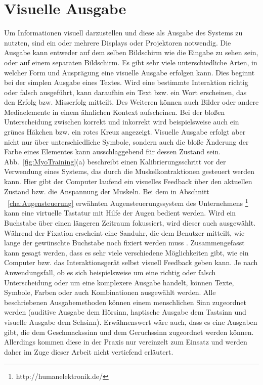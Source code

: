 \section{Visuelle Ausgabe}
Um Informationen visuell darzustellen und diese als Ausgabe des Systems zu nutzten, sind ein oder mehrere Displays oder Projektoren notwendig. Die Ausgabe kann entweder auf dem selben Bildschirm wie die Eingabe zu sehen sein, oder auf einem separaten Bildschirm.
\newline \newline
Es gibt sehr viele unterschiedliche Arten, in welcher Form und Ausprägung eine visuelle Ausgabe erfolgen kann. Dies beginnt bei der simplen Ausgabe eines Textes. Wird eine bestimmte Interaktion richtig oder falsch ausgeführt, kann daraufhin ein Text bzw. ein Wort erscheinen, das den Erfolg bzw. Misserfolg mitteilt. Des Weiteren können auch Bilder oder andere Mediaelemente in einem ähnlichen Kontext aufscheinen. Bei der bloßen Unterscheidung zwischen korrekt und inkorrekt wird beispielsweise auch ein grünes Häkchen bzw. ein rotes Kreuz angezeigt. Visuelle Ausgabe erfolgt aber nicht nur über unterschiedliche Symbole, sondern auch die bloße Änderung der Farbe eines Elementes kann ausschlaggebend für dessen Zustand sein.
\newline \newline
Abb.~\ref{fig:MyoTraining}(a) beschreibt einen Kalibrierungsschritt vor der Verwendung eines Systems, das durch die Muskelkontraktionen gesteuert werden kann. Hier gibt der Computer laufend ein visuelles Feedback über den aktuellen Zustand bzw. die Anspannung der Muskeln.
\newline \newline
Bei dem in Abschnitt ~\ref{cha:Augensteuerung} erwähnten Augensteuerungssystem des Unternehmens%
\footnote{http://humanelektronik.de/}
%
kann eine virtuelle Tastatur mit Hilfe der Augen bedient werden. Wird ein Buchstabe über einen längeren Zeitraum fokussiert, wird dieser auch ausgewählt. Während der Fixation erscheint eine Sanduhr, die dem Benutzer mitteilt, wie lange der gewünschte Buchstabe noch fixiert werden muss \cite{SEETECH}. 
%
\newline \newline
Zusammengefasst kann gesagt werden, dass es sehr viele verschiedene Möglichkeiten gibt, wie ein Computer bzw. das Interaktionsgerät selbst visuell Feedback geben kann. Je nach Anwendungsfall, ob es sich beispielsweise um eine richtig oder falsch Unterscheidung oder um eine komplexere Ausgabe handelt, können Texte, Symbole, Farben oder auch Kombinationen ausgewählt werden.
%
%
\newline \newline \newline
Alle beschriebenen Ausgabemethoden können einem menschlichen Sinn zugeordnet werden (auditive Ausgabe dem Hörsinn, haptische Ausgabe dem Tastsinn und visuelle Ausgabe dem Sehsinn). 
Erwähnenswert wäre auch, dass es eine Ausgaben gibt, die dem Geschmackssinn und dem Geruchssinn zugeordnet werden können. Allerdings kommen diese in der Praxis nur vereinzelt zum Einsatz und werden daher im Zuge dieser Arbeit nicht vertiefend erläutert.


